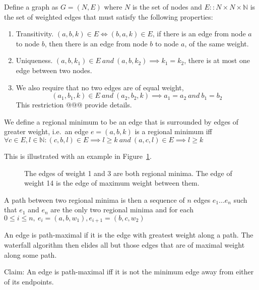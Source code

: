 \documentclass{jfp}
\begin{document}
Define a graph as $G = (N,E)$
where $N$ is the set of nodes and $E :: N\times N \times \mathbb{N}$ is the set
of weighted edges
that must satisfy the following properties:
\begin{enumerate}
\item Transitivity. $(a,b,k) \in E \iff (b,a,k) \in E$, if there is an
  edge from node $a$ to node $b$, then there is an edge from node $b$ to
  node $a$, of the same weight.

\item Uniqueness.  $(a,b,k_1) \in E\ and\ (a,b,k_2) \implies k_1 =
  k_2$, there is at most one edge between two nodes.

\item We also require that no two edges are of equal weight,
  \[
  (a_1,b_1,k) \in E\ and\ (a_2,b_2,k) \implies a_1 = a_2\ and\ b_1 =
  b_2
  \]
This restriction @@@ provide details.

\end{enumerate}

We define a regional minimum to be an edge that is surrounded by edges
of greater weight, i.e.\ an edge $e = (a,b,k)$ is a regional
minimum iff $\forall c \in E, l \in \mathbb{N} : (c,b,l) \in E
\implies l \geq k\ and\ (a,c,l) \in E \implies l \geq k $


This is illustrated with an example in Figure~\ref{fig:regmin}.

\begin{figure}
\centering
\ifpdf
\else
\fi
\caption{The edges of weight 1 and 3 are both regional minima. The
  edge of weight 14 is the edge of maximum weight between them.}
\label{fig:regmin}
\end{figure}

A path between two regional minima is then a sequence of $n$ edges $e_1 ... e_n$
such that $e_1$ and $e_n$ are the only two regional minima
and for each $ 0 \leq i \le n,\ e_i = (a,b,w_1) , e_{i+1} = (b,c,w_2)$

\noindent An edge is path-maximal if it is the edge with greatest
weight along a path.
The waterfall algorithm then elides all but those edges that are of
maximal weight along some path.

\noindent Claim: An edge is path-maximal iff it is not the minimum
edge away from either of its endpoints.
\end{document}
